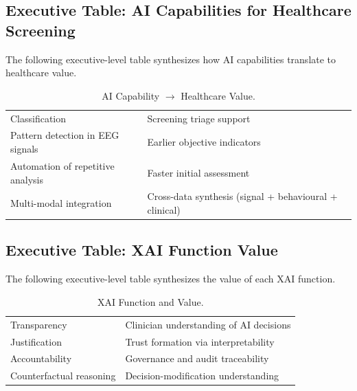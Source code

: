 \subsection{Executive Table: AI Capabilities for Healthcare Screening}
\label{sec:exec_ai_capability}

\noindent The following executive-level table synthesizes how AI capabilities translate to healthcare value.

{\tablestripes\tablefontsize
{}
\begin{xltabular}{\textwidth}{@{} >{\raggedright\arraybackslash}p{6cm} L @{}}
\caption[AI Capability $\rightarrow$ Healthcare Value]{AI Capability $\rightarrow$ Healthcare Value.}\label{tab:exec_ai_capability} \\
\toprule
{} &  \\
\midrule
\endfirsthead
\endhead
\bottomrule
\endlastfoot
Classification & Screening triage support \\
\addlinespace
Pattern detection in EEG signals & Earlier objective indicators \\
\addlinespace
Automation of repetitive analysis & Faster initial assessment \\
\addlinespace
Multi-modal integration & Cross-data synthesis (signal + behavioural + clinical) \\
\end{xltabular}}


\subsection{Executive Table: XAI Function Value}
\label{sec:exec_xai_function}

\noindent The following executive-level table synthesizes the value of each XAI function.

{\tablestripes\tablefontsize
{}
\begin{xltabular}{\textwidth}{@{} >{\raggedright\arraybackslash}p{6cm} L @{}}
\caption[XAI Function and Value]{XAI Function and Value.}\label{tab:exec_xai_function} \\
\toprule
{} &  \\
\midrule
\endfirsthead
\endhead
\bottomrule
\endlastfoot
Transparency & Clinician understanding of AI decisions \\
\addlinespace
Justification & Trust formation via interpretability \\
\addlinespace
Accountability & Governance and audit traceability \\
\addlinespace
Counterfactual reasoning & Decision-modification understanding \\
\end{xltabular}}


